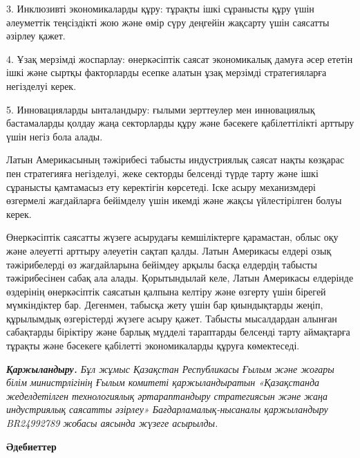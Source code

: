 \begin{multicols}{2}
3. Инклюзивті экономикаларды құру: тұрақты ішкі сұранысты құру үшін
әлеуметтік теңсіздікті жою және өмір сүру деңгейін жақсарту үшін
саясатты әзірлеу қажет.

4. Ұзақ мерзімді жоспарлау: өнеркәсіптік саясат экономикалық дамуға әсер
ететін ішкі және сыртқы факторларды есепке алатын ұзақ мерзімді
стратегияларға негізделуі керек.

5. Инновацияларды ынталандыру: ғылыми зерттеулер мен инновациялық
бастамаларды қолдау жаңа секторларды құру және бәсекеге қабілеттілікті
арттыру үшін негіз бола алады.

Латын Америкасының тәжірибесі табысты индустриялық саясат нақты көзқарас
пен стратегияға негізделуі, жеке секторды белсенді түрде тарту және ішкі
сұранысты қамтамасыз ету керектігін көрсетеді. Іске асыру механизмдері
өзгермелі жағдайларға бейімделу үшін икемді және жақсы үйлестірілген
болуы керек.

Өнеркәсіптік саясатты жүзеге асырудағы кемшіліктерге қарамастан, облыс
оқу және әлеуетті арттыру әлеуетін сақтап қалды. Латын Америкасы елдері
озық тәжірибелерді өз жағдайларына бейімдеу арқылы басқа елдердің
табысты тәжірибесінен сабақ ала алады. Қорытындылай келе, Латын
Америкасы елдерінде өздерінің өнеркәсіптік саясатын қалпына келтіру және
өзгерту үшін бірегей мүмкіндіктер бар. Дегенмен, табысқа жету үшін бар
қиындықтарды жеңіп, құрылымдық өзгерістерді жүзеге асыру қажет. Табысты
мысалдардан алынған сабақтарды біріктіру және барлық мүдделі тараптарды
белсенді тарту аймақтарға тұрақты және бәсекеге қабілетті экономикаларды
құруға көмектеседі.

\emph{{\bfseries Қаржыландыру.} Бұл жұмыс Қазақстан Республикасы Ғылым және
жоғары білім министрлігінің Ғылым комитеті қаржыландыратын «Қазақстанда
жеделдетілген технологиялық әртараптандыру стратегиясын және жаңа
индустриялық саясатты әзірлеу» Бағдарламалық-нысаналы қаржыландыру
BR24992789 жобасы аясында жүзеге асырылды.}
\end{multicols}

\begin{center}
{\bfseries Әдебиеттер}
\end{center}

